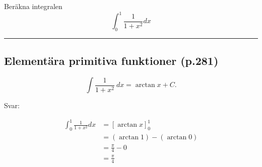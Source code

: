 \documentclass[11pt]{article}
\begin{document}
Beräkna integralen
\[
    \int_0^1 \frac{1}{1 + x^2} dx
\]

\noindent\rule{\textwidth}{0.5pt}

\subsection{Elementära primitiva funktioner (p.281)}

\[
    \int \frac{1}{1 + x^2}\ dx = \arctan x + C.
\]

Svar:

\begin{align*}
    \int_0^1 \frac{1}{1 + x^2} dx &= \left[ \arctan x \right]_0^1\\
    &= (\arctan 1) - (\arctan 0)\\
    &= \frac{\pi}{4} - 0\\
    &= \frac{\pi}{4}
\end{align*}
\end{document}
